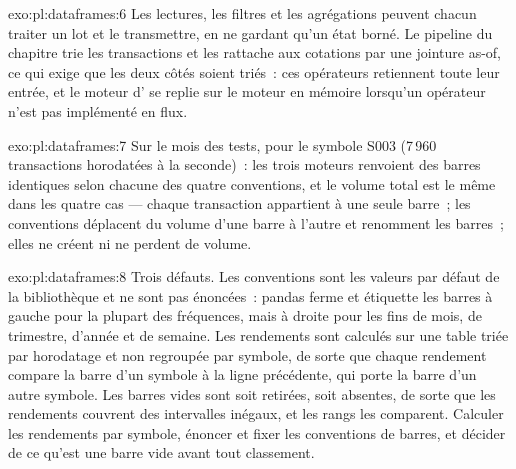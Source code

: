 \begin{solution}{exo:pl:dataframes:6}
Les lectures, les filtres et les agrégations peuvent chacun traiter un lot et le transmettre, en ne gardant qu'un état borné. Le pipeline du chapitre trie les
transactions et les rattache aux cotations par une jointure as-of, ce qui exige que les deux côtés soient triés~: ces opérateurs retiennent toute leur entrée, et le moteur d'
se replie sur le moteur en mémoire lorsqu'un opérateur n'est pas implémenté en flux.
\end{solution}

\begin{solution}{exo:pl:dataframes:7}
Sur le mois des tests, pour le symbole S003 (7\,960 transactions horodatées à la seconde)~: les trois moteurs renvoient des barres identiques selon chacune des
quatre conventions, et le volume total est le même dans les quatre cas --- chaque transaction appartient à une seule barre~; les conventions déplacent du volume
d'une barre à l'autre et renomment les barres~; elles ne créent ni ne perdent de volume.
\end{solution}

\begin{solution}{exo:pl:dataframes:8}
Trois défauts. Les conventions sont les valeurs par défaut de la bibliothèque et ne sont pas énoncées~: pandas ferme et étiquette les barres à gauche pour la plupart des fréquences, mais
à droite pour les fins de mois, de trimestre, d'année et de semaine. Les rendements sont calculés sur une table triée par horodatage et non regroupée par symbole, de sorte que chaque
rendement compare la barre d'un symbole à la ligne précédente, qui porte la barre d'un autre symbole. Les barres vides sont soit retirées, soit absentes, de sorte que les rendements
couvrent des intervalles inégaux, et les rangs les comparent. Calculer les rendements par symbole, énoncer et fixer les conventions de barres, et décider de ce qu'est une
barre vide avant tout classement.
\end{solution}

